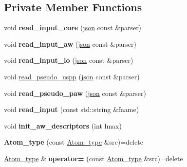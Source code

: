 \subsection*{Private Member Functions}
\begin{DoxyCompactItemize}
\item 
\hypertarget{classsirius_1_1_atom__type_a932a4f315995aec144d527a73ca207c5}{}void {\bfseries read\+\_\+input\+\_\+core} (\hyperlink{classnlohmann_1_1basic__json}{json} const \&parser)\label{classsirius_1_1_atom__type_a932a4f315995aec144d527a73ca207c5}

\item 
\hypertarget{classsirius_1_1_atom__type_a513912768d614663abb76735c1bf0759}{}void {\bfseries read\+\_\+input\+\_\+aw} (\hyperlink{classnlohmann_1_1basic__json}{json} const \&parser)\label{classsirius_1_1_atom__type_a513912768d614663abb76735c1bf0759}

\item 
\hypertarget{classsirius_1_1_atom__type_a59500e533c1ccf507cd310d4ee797027}{}void {\bfseries read\+\_\+input\+\_\+lo} (\hyperlink{classnlohmann_1_1basic__json}{json} const \&parser)\label{classsirius_1_1_atom__type_a59500e533c1ccf507cd310d4ee797027}

\item 
void \hyperlink{classsirius_1_1_atom__type_ad7f60a5c9e0f71696d7560b741232bb4}{read\+\_\+pseudo\+\_\+uspp} (\hyperlink{classnlohmann_1_1basic__json}{json} const \&parser)
\item 
\hypertarget{classsirius_1_1_atom__type_ac271c47e6b71112f04bd7d11c78e64fe}{}void {\bfseries read\+\_\+pseudo\+\_\+paw} (\hyperlink{classnlohmann_1_1basic__json}{json} const \&parser)\label{classsirius_1_1_atom__type_ac271c47e6b71112f04bd7d11c78e64fe}

\item 
\hypertarget{classsirius_1_1_atom__type_a8cb505790c157484b105d9c8b48b92ea}{}void {\bfseries read\+\_\+input} (const std\+::string \&fname)\label{classsirius_1_1_atom__type_a8cb505790c157484b105d9c8b48b92ea}

\item 
\hypertarget{classsirius_1_1_atom__type_aa8e6a43bdaf6e9ac6b6fddc478ab9ec7}{}void {\bfseries init\+\_\+aw\+\_\+descriptors} (int lmax)\label{classsirius_1_1_atom__type_aa8e6a43bdaf6e9ac6b6fddc478ab9ec7}

\item 
\hypertarget{classsirius_1_1_atom__type_a1d15cda995210bd8d4d3a266799a4dc9}{}{\bfseries Atom\+\_\+type} (const \hyperlink{classsirius_1_1_atom__type}{Atom\+\_\+type} \&src)=delete\label{classsirius_1_1_atom__type_a1d15cda995210bd8d4d3a266799a4dc9}

\item 
\hypertarget{classsirius_1_1_atom__type_ab0ee644f575466ae9792bc23f13c7e3d}{}\hyperlink{classsirius_1_1_atom__type}{Atom\+\_\+type} \& {\bfseries operator=} (const \hyperlink{classsirius_1_1_atom__type}{Atom\+\_\+type} \&src)=delete\label{classsirius_1_1_atom__type_ab0ee644f575466ae9792bc23f13c7e3d}

\end{DoxyCompactItemize}
